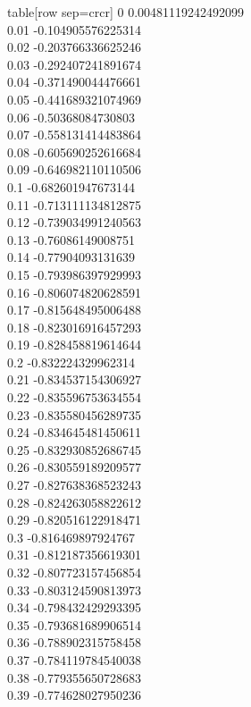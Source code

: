   table[row sep=crcr]{%
0	0.00481119242492099\\
0.01	-0.104905576225314\\
0.02	-0.203766336625246\\
0.03	-0.292407241891674\\
0.04	-0.371490044476661\\
0.05	-0.441689321074969\\
0.06	-0.50368084730803\\
0.07	-0.558131414483864\\
0.08	-0.605690252616684\\
0.09	-0.646982110110506\\
0.1	-0.682601947673144\\
0.11	-0.713111134812875\\
0.12	-0.739034991240563\\
0.13	-0.76086149008751\\
0.14	-0.77904093131639\\
0.15	-0.793986397929993\\
0.16	-0.806074820628591\\
0.17	-0.815648495006488\\
0.18	-0.823016916457293\\
0.19	-0.828458819614644\\
0.2	-0.832224329962314\\
0.21	-0.834537154306927\\
0.22	-0.835596753634554\\
0.23	-0.835580456289735\\
0.24	-0.834645481450611\\
0.25	-0.832930852686745\\
0.26	-0.830559189209577\\
0.27	-0.827638368523243\\
0.28	-0.824263058822612\\
0.29	-0.820516122918471\\
0.3	-0.816469897924767\\
0.31	-0.812187356619301\\
0.32	-0.807723157456854\\
0.33	-0.803124590813973\\
0.34	-0.798432429293395\\
0.35	-0.793681689906514\\
0.36	-0.788902315758458\\
0.37	-0.784119784540038\\
0.38	-0.779355650728683\\
0.39	-0.774628027950236\\
}
